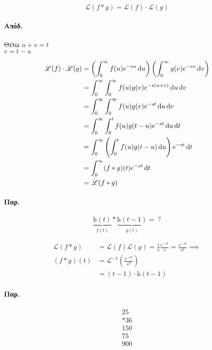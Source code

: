 \documentclass[11pt,a4paper,titlepage,draft]{article}
\begin{document}
\begin{theorem*}{}
\[
\mathscr L \left(
f * g
\right) = \mathscr L(f) \cdot \mathscr L(g)
\]
\end{theorem*}
\paragraph{Απόδ.}
Θέτω \(u+v=t\) \\ \(v=t-u\)

\begin{align*}
\mathscr L(f) \cdot \mathscr L(g) &=
\left(
\int_0^\infty f(u) e^{-su} \dif u
\right)\left(
\int_0^\infty g(v)e^{-sv}\dif v
\right)
\\
&=
\int_0^\infty \int_0^\infty f(u)g(v)e^{-s(u+v)}\dif u \dif v
\\ &=
\int_0^\infty \int_0^\infty f(u)g(v) e^{-st} \dif u \dif v
\\ &= \int_0^\infty \int_0^t f(u)g(t - u)e^{-st} \dif u \dif t
\\ &= \int_0^\infty \left(
\int_0^t f(u) g(t-u) \dif u
\right) e^{-st} \dif t
\\ &= \int_0^\infty (f*g)(t)e^{-st} \dif t\\
&= \mathscr L(f*g)
\end{align*}

\paragraph{Παρ.}
\[
\underbrace{\mathrm h(t)}_{f(t)} * \underbrace{\mathrm h(t-1)}_{g(t)} =\ ?
\]

\begin{align*}
\mathscr L(f*g) &= \mathscr L(f) \mathscr L(g) = \frac{1}{s} \frac{e^{-st}}{s} = 
\frac{e^{-st}}{s^2} \implies \\
(f*g)(t) &= \mathscr L^{-1} \left(
\frac{e^{-st}}{s^2}
\right) \\
&= (t-1) \cdot \mathrm h(t-1)
\end{align*}


\paragraph{Παρ.}
\[
\begin{array}{rr}
25 \\ *36 \\ \hline 150 \\ 75\ \\ \hline 900
\end{array}
\]
\end{document}
